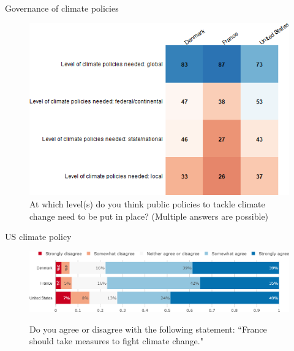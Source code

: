 \documentclass[aspectratio=169,9pt,dvipsnames]{beamer}
\begin{document}
\begin{frame}{Governance of climate policies}%
\vspace{-1cm}
\begin{figure}[h!]
\centering
\caption{\small{At which level(s) do you think public policies to tackle climate change need to be put in place? (Multiple answers are possible)}}
\includegraphics[width=.6\textwidth]{../figures/country_comparison/scale_positive_countries.png}
\end{figure}
\end{frame}

\begin{frame}{US climate policy}%
\begin{figure}[h!]
\centering
\caption{Do you agree or disagree with the following statement: ``France should take measures to fight climate change."}
\includegraphics[width=1\textwidth]{../figures/country_comparison/should_fight_CC_countries.png} \\
\end{figure}
\end{frame}
\end{document}
